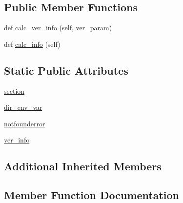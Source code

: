 \subsection*{Public Member Functions}
\begin{DoxyCompactItemize}
\item 
def \hyperlink{classnumpy_1_1distutils_1_1system__info_1_1fftw__info_a858fd85bae86c32c42b401f196fb4206}{calc\+\_\+ver\+\_\+info} (self, ver\+\_\+param)
\item 
def \hyperlink{classnumpy_1_1distutils_1_1system__info_1_1fftw__info_a93e1c4994c2d349e9f3680aa6687713c}{calc\+\_\+info} (self)
\end{DoxyCompactItemize}
\subsection*{Static Public Attributes}
\begin{DoxyCompactItemize}
\item 
\hyperlink{classnumpy_1_1distutils_1_1system__info_1_1fftw__info_aba0608f49ba6b4bac68ff3a5ce02d319}{section}
\item 
\hyperlink{classnumpy_1_1distutils_1_1system__info_1_1fftw__info_a412d4a215361ac2cea7e69a40343521f}{dir\+\_\+env\+\_\+var}
\item 
\hyperlink{classnumpy_1_1distutils_1_1system__info_1_1fftw__info_ad949f5accb081fc7633cff42a7820bb6}{notfounderror}
\item 
\hyperlink{classnumpy_1_1distutils_1_1system__info_1_1fftw__info_a67738078d5ade0aafca643933f7a75bd}{ver\+\_\+info}
\end{DoxyCompactItemize}
\subsection*{Additional Inherited Members}


\subsection{Member Function Documentation}
\mbox{\label{classnumpy_1_1distutils_1_1system__info_1_1fftw__info_a93e1c4994c2d349e9f3680aa6687713c}} 
